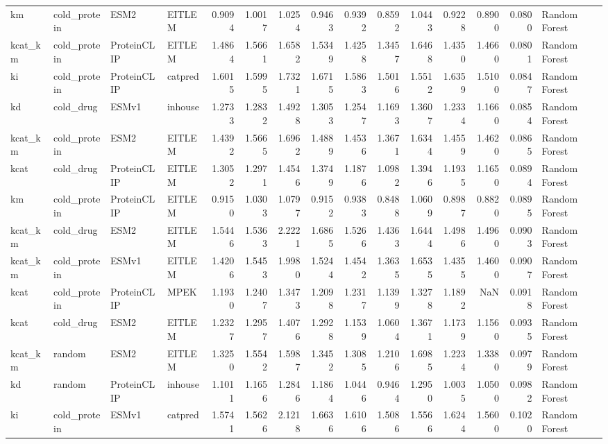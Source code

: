\begin{tabular}{llllrrrrrrrrrrl}
km & cold_protein & ESM2 & EITLEM & 0.9094 & 1.0017 & 1.0254 & 0.9463 & 0.9392 & 0.8592 & 1.0443 & 0.9228 & 0.8900 & 0.0800 & Random Forest \\
kcat_km & cold_protein & ProteinCLIP & EITLEM & 1.4864 & 1.5661 & 1.6582 & 1.5349 & 1.4258 & 1.3457 & 1.6468 & 1.4350 & 1.4660 & 0.0801 & Random Forest \\
ki & cold_protein & ProteinCLIP & catpred & 1.6015 & 1.5995 & 1.7321 & 1.6715 & 1.5863 & 1.5016 & 1.5512 & 1.6359 & 1.5100 & 0.0847 & Random Forest \\
kd & cold_drug & ESMv1 & inhouse & 1.2733 & 1.2832 & 1.4928 & 1.3053 & 1.2547 & 1.1693 & 1.3607 & 1.2334 & 1.1660 & 0.0854 & Random Forest \\
kcat_km & cold_protein & ESM2 & EITLEM & 1.4392 & 1.5665 & 1.6962 & 1.4889 & 1.4536 & 1.3671 & 1.6344 & 1.4559 & 1.4620 & 0.0865 & Random Forest \\
kcat & cold_drug & ProteinCLIP & EITLEM & 1.3052 & 1.2971 & 1.4546 & 1.3749 & 1.1876 & 1.0982 & 1.3946 & 1.1935 & 1.1650 & 0.0894 & Random Forest \\
km & cold_protein & ProteinCLIP & EITLEM & 0.9150 & 1.0303 & 1.0797 & 0.9152 & 0.9383 & 0.8488 & 1.0609 & 0.8987 & 0.8820 & 0.0895 & Random Forest \\
kcat_km & cold_drug & ESM2 & EITLEM & 1.5446 & 1.5363 & 2.2221 & 1.6865 & 1.5266 & 1.4363 & 1.6444 & 1.4986 & 1.4960 & 0.0903 & Random Forest \\
kcat_km & cold_protein & ESMv1 & EITLEM & 1.4206 & 1.5453 & 1.9980 & 1.5244 & 1.4542 & 1.3635 & 1.6535 & 1.4355 & 1.4600 & 0.0907 & Random Forest \\
kcat & cold_protein & ProteinCLIP & MPEK & 1.1930 & 1.2407 & 1.3473 & 1.2098 & 1.2317 & 1.1399 & 1.3278 & 1.1892 & NaN & 0.0918 & Random Forest \\
kcat & cold_drug & ESM2 & EITLEM & 1.2327 & 1.2957 & 1.4076 & 1.2928 & 1.1539 & 1.0604 & 1.3671 & 1.1739 & 1.1560 & 0.0935 & Random Forest \\
kcat_km & random & ESM2 & EITLEM & 1.3250 & 1.5542 & 1.5987 & 1.3452 & 1.3085 & 1.2106 & 1.6985 & 1.2234 & 1.3380 & 0.0979 & Random Forest \\
kd & random & ProteinCLIP & inhouse & 1.1011 & 1.1656 & 1.2846 & 1.1864 & 1.0446 & 0.9464 & 1.2950 & 1.0035 & 1.0500 & 0.0982 & Random Forest \\
ki & cold_protein & ESMv1 & catpred & 1.5741 & 1.5626 & 2.1218 & 1.6636 & 1.6106 & 1.5086 & 1.5566 & 1.6244 & 1.5600 & 0.1020 & Random Forest \\

\end{tabular}
